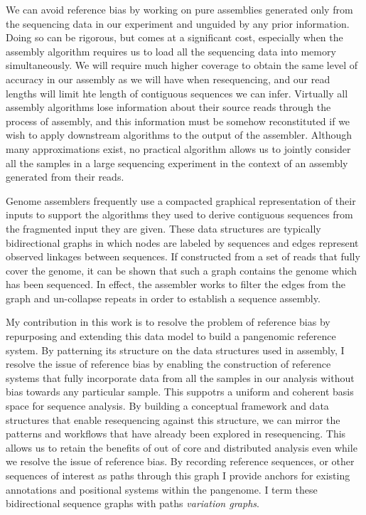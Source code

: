 We can avoid reference bias by working on pure assemblies generated only from the sequencing data in our experiment and unguided by any prior information.
Doing so can be rigorous, but comes at a significant cost, especially when the assembly algorithm requires us to load all the sequencing data into memory simultaneously.
We will require much higher coverage to obtain the same level of accuracy in our assembly as we will have when resequencing, and our read lengths will limit hte length of contiguous sequences we can infer.
Virtually all assembly algorithms lose information about their source reads through the process of assembly, and this information must be somehow reconstituted if we wish to apply downstream algorithms to the output of the assembler.
Although many approximations exist, no practical algorithm allows us to jointly consider all the samples in a large sequencing experiment in the context of an assembly generated from their reads.

Genome assemblers frequently use a compacted graphical representation of their inputs to support the algorithms they used to derive contiguous sequences from the fragmented input they are given.
These data structures are typically bidirectional graphs in which nodes are labeled by sequences and edges represent observed linkages between sequences.
If constructed from a set of reads that fully cover the genome, it can be shown that such a graph contains the genome which has been sequenced.
In effect, the assembler works to filter the edges from the graph and un-collapse repeats in order to establish a sequence assembly.

My contribution in this work is to resolve the problem of reference bias by repurposing and extending this data model to build a pangenomic reference system.
By patterning its structure on the data structures used in assembly, I resolve the issue of reference bias by enabling the construction of reference systems that fully incorporate data from all the samples in our analysis without bias towards any particular sample.
This suppotrs a uniform and coherent basis space for sequence analysis.
By building a conceptual framework and data structures that enable resequencing against this structure, we can mirror the patterns and workflows that have already been explored in resequencing.
This allows us to retain the benefits of out of core and distributed analysis even while we resolve the issue of reference bias.
By recording reference sequences, or other sequences of interest as paths through this graph I provide anchors for existing annotations and positional systems within the pangenome.
I term these bidirectional sequence graphs with paths \emph{variation graphs}.

